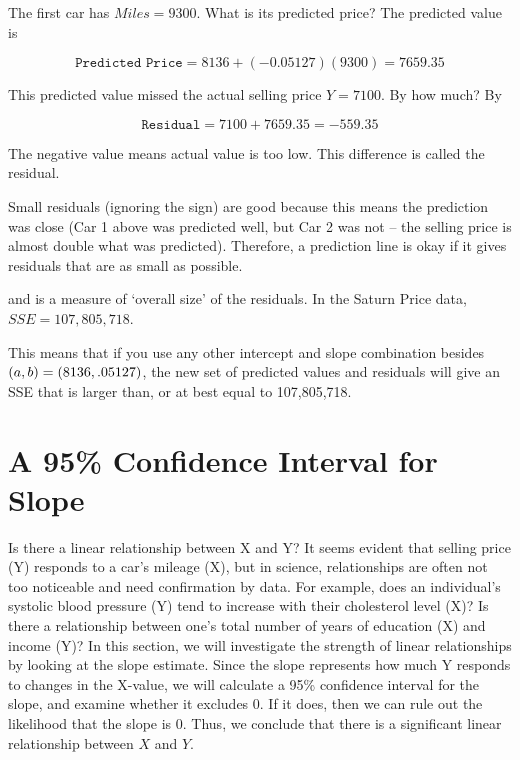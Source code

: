 \documentclass[11pt]{book}\usepackage[]{graphicx}\usepackage[]{color}
\begin{document}
The first car has $Miles = 9300$.  What is its predicted price?  The predicted value is 

\begin{equation*}
  \texttt{Predicted Price} = 8136 + (-0.05127)(9300) = 7659.35
\end{equation*}

This predicted value missed the actual selling price $Y = 7100$.  By how much? By

\begin{equation*}
  \texttt{Residual} = 7100 + 7659.35 = -559.35
\end{equation*}

The negative value means actual value is too low.  This difference is called the residual.  

Small residuals (ignoring the sign) are good because this means the prediction was close  (Car 1 above was predicted well, but Car 2 was not -- the selling price is almost double what was predicted).  Therefore, a prediction line is okay if it gives residuals that are as small as possible.  

\begin{center}
\end{center}

and is a measure of `overall size' of the residuals.  In the Saturn Price data, \\
$SSE =  107,805,718$.

\begin{center}
\end{center}

This means that if you use any other intercept and slope combination besides $(a,b) = \\ (8136,.05127)$, the new set of predicted values and residuals will give an SSE that is larger than, or at best equal to 107,805,718. 

\section{A 95\% Confidence Interval for Slope}

Is there a linear relationship between X and Y?  It seems evident that selling price (Y) responds to a car's mileage (X), but in science, relationships are often not too noticeable and need confirmation by data.  For example, does an individual's systolic blood pressure (Y) tend to increase with their cholesterol level (X)?   Is there a relationship between one's total number of years of education (X) and income (Y)?  In this section, we will investigate the strength of linear relationships by looking at the slope estimate.  Since the slope represents how much Y responds to changes in the X-value, we will calculate a 95\% confidence interval for the slope, and examine whether it excludes 0.  If it does, then we can rule out the likelihood that the slope is 0.  Thus, we conclude that there is a significant linear relationship between $X$ and $Y$.
\end{document}

